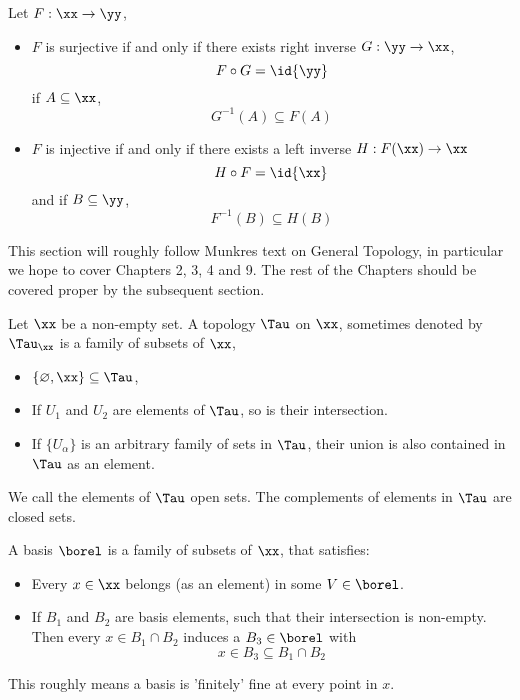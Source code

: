\documentclass[../main-v2-manifolds.tex]{subfiles}
\begin{document}
\begin{wts}
    Let $F: \xx\to\yy$,
    \begin{itemize}
        \item $F$ is surjective if and only if there exists right inverse $G:\yy\to \xx$, 
        \[
            F\circ G = \id{\yy}
        \]
        if $A\subseteq\xx$, 
        \[
            G^{-1}(A)\subseteq F(A)
        \]
        \item $F$ is injective if and only if there exists a left inverse $H:F(\xx)\to \xx$
        \[
            H \circ F = \id{\xx}
        \]
        and if $B\subseteq\yy$, 
        \[
            F^{-1}(B)\subseteq H(B)
        \]
    \end{itemize}
\end{wts}

This section will roughly follow Munkres text on General Topology, in particular we hope to cover Chapters 2, 3, 4 and 9. The rest of the Chapters should be covered proper by the subsequent section.


\begin{definition}[Topology]\label{chp4:topology-definition}
    Let $\xx$ be a non-empty set. A topology $\Tau$ on $\xx$, sometimes denoted by $\Tau_\xx$ is a family of subsets of $\xx$, 
\begin{itemize}
    \item $\{\varnothing,\xx\}\subseteq \Tau$,
    \item If $U_1$ and $U_2$ are elements of $\Tau$, so is their intersection.
    \item If $\{U_\alpha\}$ is an arbitrary family of sets in $\Tau$, their union is also contained in $\Tau$ as an element.
\end{itemize}
We call the elements of $\Tau$ open sets. The complements of elements in $\Tau$ are closed sets.
\end{definition}



\begin{definition}\label{chp4:basis-definition}
    A basis $\borel$ is a family of subsets of $\xx$, that satisfies:
    \begin{itemize}
        \item Every $x\in\xx$ belongs (as an element) in some $V\in\borel$.
        \item If $B_1$ and $B_2$ are basis elements, such that their intersection is non-empty. Then every $x\in B_1\cap B_2$ induces a $B_3\in\borel$ with 
        \[
            x\in B_3\subseteq B_1\cap B_2
        \]
    \end{itemize}
    This roughly means a basis is 'finitely' fine at every point in $x$.
\end{definition}
\end{document}
